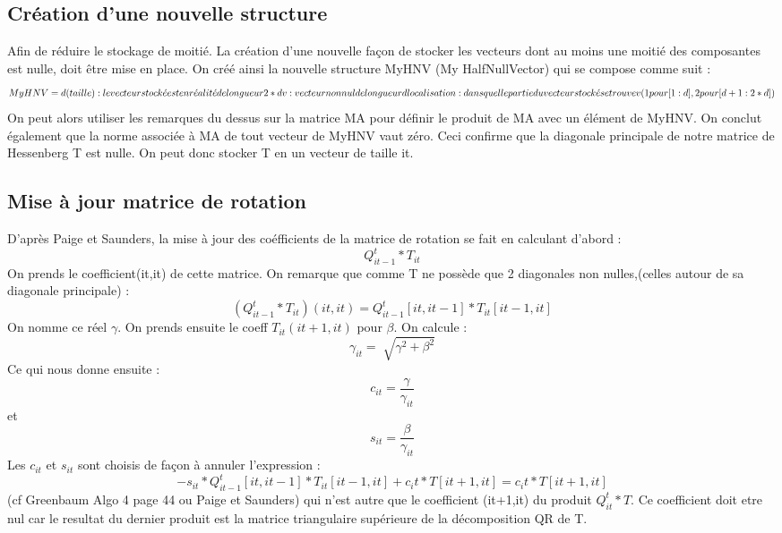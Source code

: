 \documentclass[12 pt]{article}
\begin{document}
\subsection*{Création d'une nouvelle structure}

Afin de réduire le stockage de moitié. La création d'une nouvelle façon de stocker les vecteurs dont au moins une moitié des composantes est nulle, doit être mise en place. On créé ainsi la nouvelle structure MyHNV (My HalfNullVector) qui se compose comme suit :
  \[ MyHNV = {  d(taille) : le vecteur stock\acute{e} est en r\acute{e}alit\acute{e} de longueur 2*d \\   
                v : vecteur non nul de longueur d \\
                localisation : dans quelle partie du vecteur stock\acute{e} se trouve v (1 pour [1:d], 2 pour [d+1:2*d])  } \]
On peut alors utiliser les remarques du dessus sur la matrice MA pour définir le produit de MA avec un élément de MyHNV. 
On conclut également que la norme associée à MA de tout vecteur de MyHNV vaut zéro. Ceci confirme que la diagonale principale de notre matrice 
de Hessenberg T est nulle. On peut donc stocker T en un vecteur de taille it.

\subsection*{Mise à jour matrice de rotation}

D'après Paige et Saunders, la mise à jour des coéfficients de la matrice de rotation se fait en calculant d'abord :
 \[ Q^t_{it-1}*T_{it} \]
On prends le coefficient(it,it) de cette matrice. On remarque que comme T ne possède que 2 diagonales non nulles,(celles autour de sa diagonale principale) :
 \[ (Q^t_{it-1}*T_{it}) (it,it) =  Q^t_{it-1}[it,it-1]*T_{it}[it-1,it] \]
On nomme ce réel $\gamma$. On prends ensuite le coeff $T_{it}(it+1,it)$ pour $\beta$.
On calcule :
\[\gamma_{it} = \sqrt[]{\gamma^2 + \beta^2} \] 
Ce qui nous donne ensuite :
\[ c_{it} = \frac{\gamma}{ \gamma_{it}}\]   et \[s_{it} = \frac{\beta}{\gamma_{it}} \]
Les $c_{it}$ et $s_{it}$ sont choisis de façon à annuler l'expression :
\[ -s_{it}*Q^t_{it-1}[it,it-1]*T_{it}[it-1,it] + c_it*T[it+1,it] = c_it*T[it+1,it] \] (cf Greenbaum Algo 4 page 44 ou Paige et Saunders) 
qui n'est autre que le coefficient (it+1,it) du produit $Q^t_{it}*T$. Ce coefficient doit etre nul 
car le resultat du dernier produit est la matrice triangulaire supérieure de la décomposition QR de T.
\end{document}
